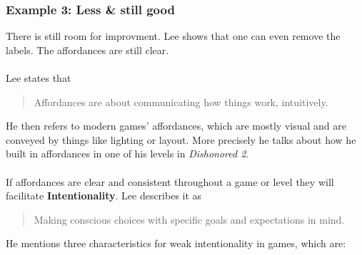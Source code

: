 \documentclass[a4paper]{article}
\begin{document}
\subsubsection{Example 3: Less \& still good}
There is still room for improvment. Lee shows that one can even remove the labels. The affordances are still clear.\\ \\
Lee states that 
\begin{quote}
Affordances are about communicating how things work, intuitively.
\end{quote}
He then refers to modern games' affordances, which are mostly visual and are conveyed by things like lighting or layout. More precisely he talks about how he built in affordances in one of his levels in \textit{Dishonored 2}.\\ \\
If affordances are clear and consistent throughout a game or level they will facilitate \textbf{Intentionality}.
Lee describes it as 
\begin{quote}
Making conscious choices with specific goals and expectations in mind. 
\end{quote}
He mentions three characteristics for weak intentionality in games, which are:
\end{document}
